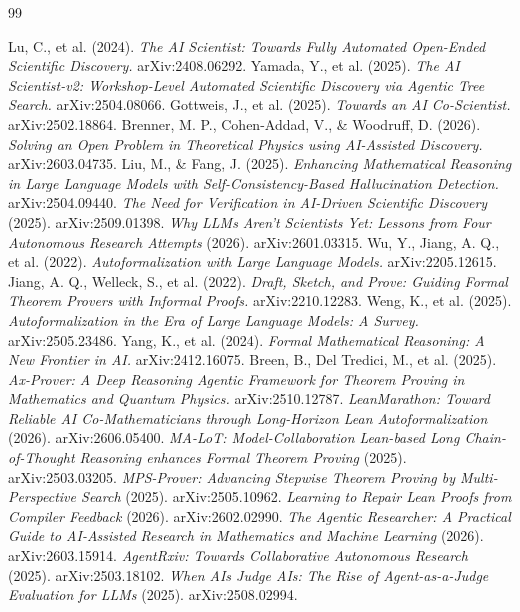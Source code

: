 \documentclass[11pt]{article}
\begin{document}
\begin{thebibliography}{99}

 Lu, C., et al. (2024). \emph{The AI Scientist: Towards Fully Automated Open-Ended Scientific Discovery.} arXiv:2408.06292.
 Yamada, Y., et al. (2025). \emph{The AI Scientist-v2: Workshop-Level Automated Scientific Discovery via Agentic Tree Search.} arXiv:2504.08066.
 Gottweis, J., et al. (2025). \emph{Towards an AI Co-Scientist.} arXiv:2502.18864.
 Brenner, M. P., Cohen-Addad, V., \& Woodruff, D. (2026). \emph{Solving an Open Problem in Theoretical Physics using AI-Assisted Discovery.} arXiv:2603.04735.
 Liu, M., \& Fang, J. (2025). \emph{Enhancing Mathematical Reasoning in Large Language Models with Self-Consistency-Based Hallucination Detection.} arXiv:2504.09440.
 \emph{The Need for Verification in AI-Driven Scientific Discovery} (2025). arXiv:2509.01398.
 \emph{Why LLMs Aren't Scientists Yet: Lessons from Four Autonomous Research Attempts} (2026). arXiv:2601.03315.
 Wu, Y., Jiang, A. Q., et al. (2022). \emph{Autoformalization with Large Language Models.} arXiv:2205.12615.
 Jiang, A. Q., Welleck, S., et al. (2022). \emph{Draft, Sketch, and Prove: Guiding Formal Theorem Provers with Informal Proofs.} arXiv:2210.12283.
 Weng, K., et al. (2025). \emph{Autoformalization in the Era of Large Language Models: A Survey.} arXiv:2505.23486.
 Yang, K., et al. (2024). \emph{Formal Mathematical Reasoning: A New Frontier in AI.} arXiv:2412.16075.
 Breen, B., Del Tredici, M., et al. (2025). \emph{Ax-Prover: A Deep Reasoning Agentic Framework for Theorem Proving in Mathematics and Quantum Physics.} arXiv:2510.12787.
 \emph{LeanMarathon: Toward Reliable AI Co-Mathematicians through Long-Horizon Lean Autoformalization} (2026). arXiv:2606.05400.
 \emph{MA-LoT: Model-Collaboration Lean-based Long Chain-of-Thought Reasoning enhances Formal Theorem Proving} (2025). arXiv:2503.03205.
 \emph{MPS-Prover: Advancing Stepwise Theorem Proving by Multi-Perspective Search} (2025). arXiv:2505.10962.
 \emph{Learning to Repair Lean Proofs from Compiler Feedback} (2026). arXiv:2602.02990.
 \emph{The Agentic Researcher: A Practical Guide to AI-Assisted Research in Mathematics and Machine Learning} (2026). arXiv:2603.15914.
 \emph{AgentRxiv: Towards Collaborative Autonomous Research} (2025). arXiv:2503.18102.
 \emph{When AIs Judge AIs: The Rise of Agent-as-a-Judge Evaluation for LLMs} (2025). arXiv:2508.02994.

\end{thebibliography}
\end{document}
